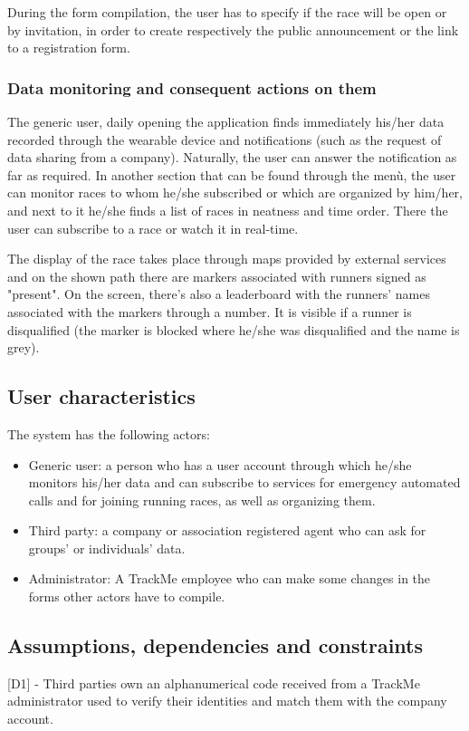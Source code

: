 During the form compilation, the user has to specify if the race will be open or by invitation, in order to create respectively the public announcement or the link to a registration form.
 
\subsubsection{Data monitoring and consequent actions on them}

The generic user, daily opening the application finds immediately his/her data recorded through the wearable device and notifications (such as the request of data sharing from a company). Naturally, the user can answer the notification as far as required. In another section that can be found through the menù, the user can monitor races to whom he/she subscribed or which are organized by him/her, and next to it he/she finds a list of races in neatness and time order. There the user can subscribe to a race or watch it in real-time.

The display of the race takes place through maps provided by external services and on the shown path there are markers associated with runners signed as "present". On the screen, there's also a leaderboard with the runners' names associated with the markers through a number. It is visible if a runner is disqualified (the marker is blocked where he/she was disqualified and the name is grey).
 
\subsection{User characteristics}
The system has the following actors:
\begin{itemize}
\item Generic user: a person who has a user account through which he/she monitors his/her data and can subscribe to services for emergency automated calls and for joining running races, as well as organizing them.
\item Third party: a company or association registered agent who can ask for groups' or individuals' data.
\item Administrator: A TrackMe employee who can make some changes in the forms other actors have to compile.
\end{itemize}

\subsection{Assumptions, dependencies and constraints}
[D1] - Third parties own an alphanumerical code received from a TrackMe administrator used to verify their identities and match them with the company account. \newline

